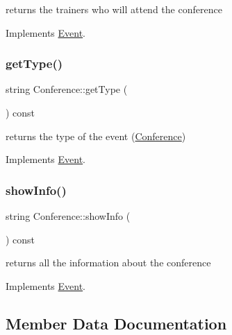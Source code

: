 returns the trainers who will attend the conference 



Implements \hyperlink{classEvent_a11aad3e5a7ee85bc61b6811d050c5d70}{Event}.

\mbox{\label{classConference_ad1cf07b29a4c4cc36483603ef9536186}} 
\subsubsection{\texorpdfstring{get\+Type()}{getType()}}
{\footnotesize\ttfamily string Conference\+::get\+Type (\begin{DoxyParamCaption}{ }\end{DoxyParamCaption}) const\hspace{0.3cm}{\ttfamily [virtual]}}



returns the type of the event (\hyperlink{classConference}{Conference}) 



Implements \hyperlink{classEvent_a224dbd9a9aee5937ba0c8ea1a056af1f}{Event}.

\mbox{\label{classConference_a7a2f7b38c728f487d82356d3c671ef88}} 
\subsubsection{\texorpdfstring{show\+Info()}{showInfo()}}
{\footnotesize\ttfamily string Conference\+::show\+Info (\begin{DoxyParamCaption}{ }\end{DoxyParamCaption}) const\hspace{0.3cm}{\ttfamily [virtual]}}



returns all the information about the conference 



Implements \hyperlink{classEvent_aaa38f467e933c57190d43351bdb817be}{Event}.



\subsection{Member Data Documentation}
\mbox{\label{classConference_ab3acc9b9aec3a4dbcfd18d1611337ecb}} 
